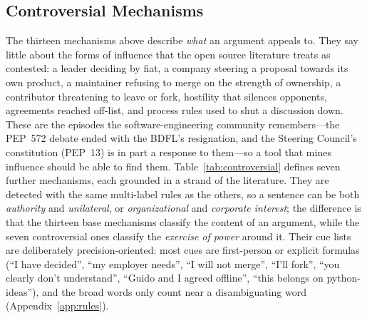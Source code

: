 \subsection{Controversial Mechanisms}
\label{sec:controversial}

The thirteen mechanisms above describe \emph{what} an argument appeals to. They say little about the forms of influence that the open source literature treats as contested: a leader deciding by fiat, a company steering a proposal towards its own product, a maintainer refusing to merge on the strength of ownership, a contributor threatening to leave or fork, hostility that silences opponents, agreements reached off-list, and process rules used to shut a discussion down. These are the episodes the software-engineering community remembers---the PEP~572 debate ended with the BDFL's resignation, and the Steering Council's constitution (PEP~13) is in part a response to them---so a tool that mines influence should be able to find them. Table~\ref{tab:controversial} defines seven further mechanisms, each grounded in a strand of the literature. They are detected with the same multi-label rules as the others, so a sentence can be both \emph{authority} and \emph{unilateral}, or \emph{organizational} and \emph{corporate interest}; the difference is that the thirteen base mechanisms classify the content of an argument, while the seven controversial ones classify the \emph{exercise of power} around it. Their cue lists are deliberately precision-oriented: most cues are first-person or explicit formulas (``I have decided'', ``my employer needs'', ``I will not merge'', ``I'll fork'', ``you clearly don't understand'', ``Guido and I agreed offline'', ``this belongs on python-ideas''), and the broad words only count near a disambiguating word (Appendix~\ref{app:rules}).

